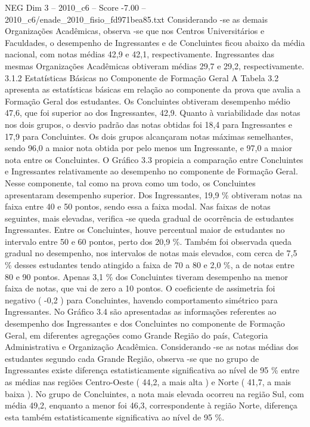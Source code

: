 \begin{textsample}{NEG Dim 3 – 2010\_c6 – Score -7.00 – 2010\_c6/enade\_2010\_fisio\_fd971bea85.txt}
Considerando -se as demais Organizações Acadêmicas, observa -se que nos Centros Universitários e Faculdades, o desempenho de Ingressantes e de Concluintes ficou abaixo da média nacional, com notas médias 42,9 e 42,1, respectivamente.
Ingressantes das mesmas Organizações Acadêmicas obtiveram médias 29,7 e 29,2, respectivamente. 3.1.2 Estatísticas Básicas no Componente de Formação Geral A Tabela 3.2 apresenta as estatísticas básicas em relação ao componente da prova que avalia a Formação Geral dos estudantes.
Os Concluintes obtiveram desempenho médio 47,6, que foi superior ao dos Ingressantes, 42,9.
Quanto à variabilidade das notas nos dois grupos, o desvio padrão das notas obtidas foi 18,4 para Ingressantes e 17,9 para Concluintes.
Os dois grupos alcançaram notas máximas semelhantes, sendo 96,0 a maior nota obtida por pelo menos um Ingressante, e 97,0 a maior nota entre os Concluintes.
O Gráfico 3.3 propicia a comparação entre Concluintes e Ingressantes relativamente ao desempenho no componente de Formação Geral.
Nesse componente, tal como na prova como um todo, os Concluintes apresentaram desempenho superior.
Dos Ingressantes, 19,9 \% obtiveram notas na faixa entre 40 e 50 pontos, sendo essa a faixa modal.
Nas faixas de notas seguintes, mais elevadas, verifica -se queda gradual de ocorrência de estudantes Ingressantes.
Entre os Concluintes, houve percentual maior de estudantes no intervalo entre 50 e 60 pontos, perto dos 20,9 \%.
Também foi observada queda gradual no desempenho, nos intervalos de notas mais elevados, com cerca de 7,5 \% desses estudantes tendo atingido a faixa de 70 a 80 e 2,0 \%, a de notas entre 80 e 90 pontos.
Apenas 3,1 \% dos Concluintes tiveram desempenho na menor faixa de notas, que vai de zero a 10 pontos.
O coeficiente de assimetria foi negativo ( -0,2 ) para Concluintes, havendo comportamento simétrico para Ingressantes.
No Gráfico 3.4 são apresentadas as informações referentes ao desempenho dos Ingressantes e dos Concluintes no componente de Formação Geral, em diferentes agregações como Grande Região do país, Categoria Administrativa e Organização Acadêmica.
Considerando -se as notas médias dos estudantes segundo cada Grande Região, observa -se que no grupo de Ingressantes existe diferença estatisticamente significativa ao nível de 95 \% entre as médias nas regiões Centro-Oeste ( 44,2, a mais alta ) e Norte ( 41,7, a mais baixa ).
No grupo de Concluintes, a nota mais elevada ocorreu na região Sul, com média 49,2, enquanto a menor foi 46,3, correspondente à região Norte, diferença esta também estatisticamente significativa ao nível de 95 \%.

\end{textsample}
